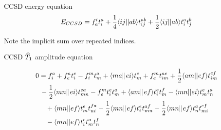 









\begin{frame}{CCSD energy equation }
    \begin{equation*}
    E_{CCSD} = 
    f_a^i t_i^a + \frac{1}{4} \langle ij||ab\rangle t_{ij}^{ab} + \frac{1}{2} \langle ij||ab\rangle  t_i^a  t_j^b
\end{equation*}

Note the implicit sum over repeated indices.



\end{frame}

    







\begin{frame}{CCSD $\widehat{T}_1$ amplitude equation }

\begin{align*}
    0 &= f_{i}^a + f_{e}^a t_i^e - f_{i}^mt_m^a + \langle ma||ei\rangle t_m^e 
        + f_{e}^m t_{im}^{ae} + \frac{1}{2} \langle am||ef\rangle t_{im}^{ef} \\
        &\, - \frac{1}{2} \langle mn||ei\rangle t_{mn}^{ea} - f_{e}^m t_i^e t_m^a
        + \langle am||ef\rangle t_i^e t_m^f - \langle mn||ei\rangle t_m^e t_n^a  \\
        & \quad + \langle mn||ef\rangle t_m^e t_{ni}^{fa}
        - \frac{1}{2} \langle mn||ef\rangle t_i^e t_{mn}^{af}
        - \frac{1}{2} \langle mn||ef\rangle t_n^a t_{mi}^{ef}\\
        & \quad  - \langle mn||ef\rangle t_i^e t_m^a t_n^f
\end{align*}


\end{frame}

    





